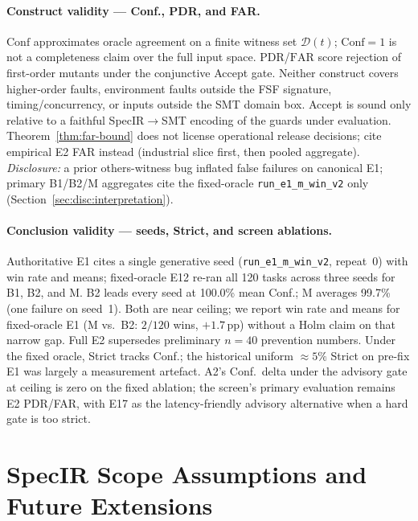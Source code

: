 \paragraph{Construct validity --- Conf., PDR, and FAR.}
$\mathrm{Conf}$ approximates oracle agreement on a finite witness set
$\mathcal{D}(t)$; $\mathrm{Conf}{=}1$ is not a completeness claim over the full
input space.
$\mathrm{PDR}$/$\mathrm{FAR}$ score rejection of first-order mutants under the
conjunctive Accept gate.
Neither construct covers higher-order faults, environment faults outside the
FSF signature, timing/concurrency, or inputs outside the SMT domain box.
Accept is sound only relative to a faithful SpecIR$\to$SMT encoding of the
guards under evaluation.
Theorem~\ref{thm:far-bound} does not license operational release decisions;
cite empirical E2 FAR instead (industrial slice first, then pooled aggregate).
\emph{Disclosure:} a prior others-witness bug inflated false failures on
canonical E1; primary B1/B2/M aggregates cite the fixed-oracle
\texttt{run\_e1\_m\_win\_v2} only
(Section~\ref{sec:disc:interpretation}).

\paragraph{Conclusion validity --- seeds, Strict, and screen ablations.}
Authoritative E1 cites a single generative seed (\texttt{run\_e1\_m\_win\_v2},
repeat~0) with win rate and means; fixed-oracle E12 re-ran all 120 tasks
across three seeds for B1, B2, and M.
B2 leads every seed at 100.0\% mean Conf.; M averages 99.7\% (one failure on
seed~1).
Both are near ceiling; we report win rate and means for fixed-oracle E1
(M vs.\ B2: $2/120$ wins, ${+}1.7$\,pp) without a Holm claim on that narrow
gap.
Full E2 supersedes preliminary $n{=}40$ prevention numbers.
Under the fixed oracle, Strict tracks Conf.; the historical uniform
${\approx}5\%$ Strict on pre-fix E1 was largely a measurement artefact.
A2's Conf.\ delta under the advisory gate at ceiling is zero on the fixed
ablation; the screen's primary evaluation remains E2 PDR/FAR, with E17 as the
latency-friendly advisory alternative when a hard gate is too strict.


\section{SpecIR Scope Assumptions and Future Extensions}
\label{sec:disc:specir-scope}

